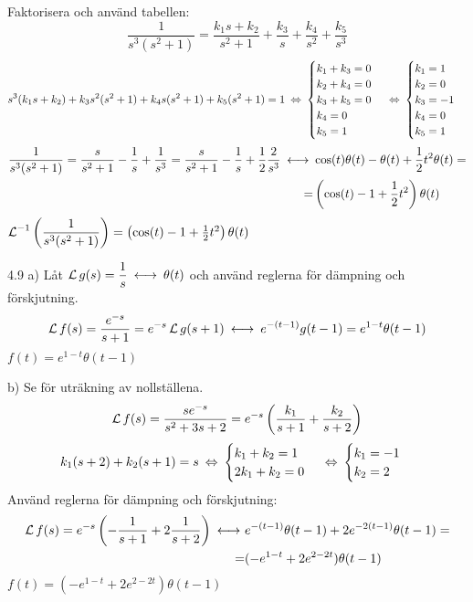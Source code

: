 \begin{task}{4.8}
	Faktorisera och använd tabellen:
	\[\frac{1}{s^3(s^2+1)}=\frac{k_1s+k_2}{s^2+1}+\frac{k_3}{s}+\frac{k_4}{s^2}+\frac{k_5}{s^3}\]
	\[s^3(k_1s+k_2)+k_3s^2(s^2+1)+k_4s(s^2+1)+k_5(s^2+1)=1 \lra
	\begin{cases}
	k_1+k_3=0 \\
	k_2+k_4=0 \\
	k_3+k_5=0 \\
	k_4=0 \\
	k_5=1
	\end{cases} \lra
	\begin{cases}
	k_1=1 \\
	k_2=0 \\
	k_3=-1 \\
	k_4=0 \\
	k_5=1
	\end{cases} \]
	\begin{align*}
	\frac{1}{s^3(s^2+1)}=
	\frac{s}{s^2+1}-\frac{1}{s}+\frac{1}{s^3}=
	\frac{s}{s^2+1}-\frac{1}{s}+\frac{1}{2}\*\frac{2}{s^3} \llra
	&\cos(t)\theta(t)-\theta(t)+\frac{1}{2}t^2\theta(t) = \\ =
	&\left(\cos(t)-1+\frac{1}{2}t^2\right)\theta(t)
	\end{align*}
	\ans $\operatorname{\mathcal{L}}^{-1}\left(\dfrac{1}{s^3(s^2+1)}\right)=\left(\cos(t)-1+\frac{1}{2}t^2\right)\theta(t)$
\end{task}

\begin{task}{4.9 a)}
	Låt $\laplace g(s)=\dfrac{1}{s}\llra\theta(t)$ och använd reglerna för dämpning och förskjutning.
	\[\laplace f(s)=\frac{e^{-s}}{s+1}=e^{-s}\laplace g(s+1) \llra e^{-(t-1)}g(t-1)=e^{1-t}\theta(t-1)\]
	\ans $f(t)=e^{1-t}\theta(t-1)$
\end{task}

\begin{task}{b)}
	Se  för uträkning av nollställena.
	\[\operatorname{\mathcal{L}} f(s)=\frac{se^{-s}}{s^2+3s+2}=e^{-s}\left(\frac{k_1}{s+1}+\frac{k_2}{s+2}\right)\]
	\[k_1(s+2)+k_2(s+1)=s\lra
	\begin{cases}
	k_1+k_2=1 \\
	2k_1+k_2=0
	\end{cases}\lra
	\begin{cases}
	k_1=-1 \\
	k_2=2
	\end{cases}\]
	Använd reglerna för dämpning och förskjutning:
	\begin{align*}
	\laplace f(s)=
	e^{-s}\left(-\frac{1}{s+1}+2\frac{1}{s+2}\right)\llra
	&e^{-(t-1)}\theta(t-1)+2e^{-2(t-1)}\theta(t-1)= \\ =
	&(-e^{1-t}+2e^{2-2t})\theta(t-1)
	\end{align*}
	\ans $f(t)=(-e^{1-t}+2e^{2-2t})\theta(t-1)$
\end{task}

